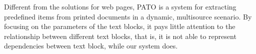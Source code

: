 Different from the solutions for web pages,
PATO \cite{bartoli2014semisupervised}
is a system for extracting predefined items from
printed documents in a dynamic, multisource scenario.
By focusing on the parameters of the text blocks, it pays little attention to the
relationship between different text blocks, that is, it is not able to
represent dependencies between text block, while our system does.

%

